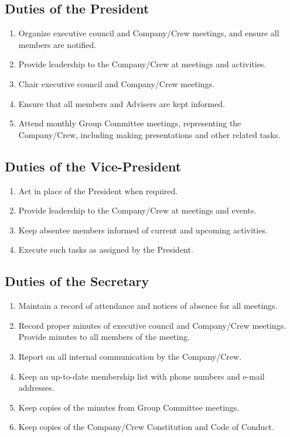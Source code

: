 \documentclass{Service_Corps_Document}
\begin{document}
\subsection{Duties of the President}
\begin{enumerate}
	\item Organize executive council and Company/Crew meetings, and ensure all members are notified.
	\item Provide leadership to the Company/Crew at meetings and activities. 
	\item Chair executive council and Company/Crew meetings.
	\item Ensure that all members and Advisers are kept informed.
	\item Attend monthly Group Committee meetings, representing the Company/Crew, including making presentations and other related tasks.
\end{enumerate}
\subsection{Duties of the Vice-President}
\begin{enumerate}
	\item Act in place of the President when required.
	\item Provide leadership to the Company/Crew at meetings and events. 
	\item Keep absentee members informed of current and upcoming activities.
	\item Execute such tasks as assigned by the President.
\end{enumerate}
\subsection{Duties of the Secretary}
\begin{enumerate}
	\item Maintain a record of attendance and notices of absence for all meetings.
	\item Record proper minutes of executive council and Company/Crew meetings. Provide minutes to all members of the meeting.
	\item Report on all internal communication by the Company/Crew.
	\item Keep an up-to-date membership list with phone numbers and e-mail addresses.
	\item Keep copies of the minutes from Group Committee meetings. 
	\item Keep copies of the Company/Crew Constitution and Code of Conduct.
\end{enumerate}
\end{document}
